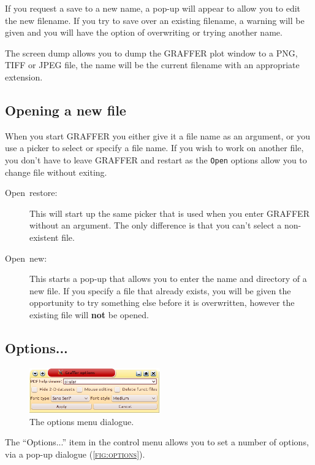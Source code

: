 \documentclass[11pt,twoside,english]{article}
\begin{document}
If you request a save to a new name, a pop-up will appear to allow you
to edit the new filename. If you try to save over an existing filename,
a warning will be given and you will have the option of overwriting or
trying another name.

The screen dump allows you to dump the GRAFFER plot window to a PNG,
TIFF or JPEG file, the name will be the current filename with an
appropriate extension.


\subsection{Opening a new file}

When you start GRAFFER you either give it a file name as an argument,
or you use a picker to select or specify a file name. If you wish to
work on another file, you don't have to leave GRAFFER and restart as
the \texttt{Open} options allow you to change file without exiting.

\begin{description}
\item [Open~restore:]This will start up the same picker that is used
  when you enter GRAFFER without an argument. The only difference is
  that you can't select a non-existent file.
\item [Open~new:]This starts a pop-up that allows you to enter the name
  and directory of a new file. If you specify a file that already
  exists, you will be given the opportunity to try something else
  before it is overwritten, however the existing file will \textbf{not}
  be opened.
\end{description}

\subsection{Options...}
\label{sec:options}

\begin{figure}
  \centering
  \includegraphics[width=0.5\textwidth]{options}
  \caption{The options menu dialogue.}
  \label{fig:options}
\end{figure}
The ``Options...'' item in the control menu allows you to set a number
of options, via a pop-up dialogue (\textsc{\autoref{fig:options}}).
\end{document}
